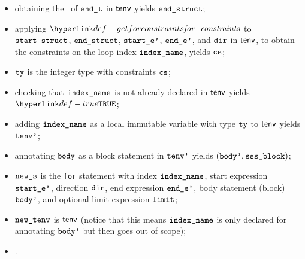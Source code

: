 \begin{itemize}
  \item obtaining the \underlyingtype\ of $\texttt{end\_t}$ in $\textsf{tenv}$ yields $\texttt{end\_struct}$\ProseOrTypeError;
  \item applying $\getforconstraints$ to $\texttt{start\_struct}$, $\texttt{end\_struct}$,
        $\texttt{start\_e'}$, $\texttt{end\_e'}$, and $\texttt{dir}$ in $\textsf{tenv}$,
        to obtain the constraints on the loop index $\texttt{index\_name}$,
        yields $\texttt{cs}$\ProseOrTypeError;
  \item $\texttt{ty}$ is the integer type with constraints $\texttt{cs}$;
  \item checking that $\texttt{index\_name}$ is not already declared in $\textsf{tenv}$ yields $\True$\ProseOrTypeError;
  \item adding $\texttt{index\_name}$ as a local immutable variable with type $\texttt{ty}$ to $\textsf{tenv}$ yields $\texttt{tenv'}$;
  \item annotating $\texttt{body}$ as a block statement in $\texttt{tenv'}$ yields $(\texttt{body'}, \texttt{ses\_block})$\ProseOrTypeError;
  \item $\texttt{new\_s}$ is the \texttt{for} statement with index $\texttt{index\_name}$,
        start expression $\texttt{start\_e'}$, direction $\texttt{dir}$,
        end expression $\texttt{end\_e'}$,
        body statement (block) $\texttt{body'}$, and
        optional limit expression $\texttt{limit}$;
  \item $\texttt{new\_tenv}$ is $\textsf{tenv}$ (notice that this means $\texttt{index\_name}$ is only declared for annotating $\texttt{body'}$ but then goes
        out of scope);
  \item {}.
\end{itemize}
\FormallyParagraph

